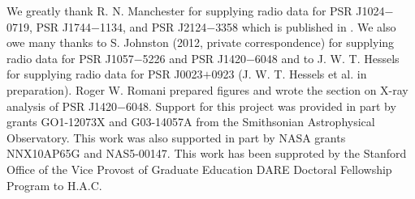 \acknowledgements
We greatly thank R. N. Manchester for supplying 
radio data for PSR J1024$-$0719, PSR J1744$-$1134, and PSR J2124$-$3358 which is
published in \cite{yan2011polarization}.
We also owe many thanks to S. Johnston (2012, private correspondence) 
for supplying radio data for
PSR J1057$-$5226 and PSR J1420$-$6048 and to J. W. T. Hessels for supplying
radio data for PSR J0023$+$0923 (J. W. T. Hessels et al. in preparation).
Roger W. Romani prepared figures and wrote the section on X-ray analysis of PSR J1420$-$6048.
Support for this project was provided in part by grants GO1-12073X and
G03-14057A from the Smithsonian Astrophysical Observatory. This work
was also supported in part by NASA grants NNX10AP65G and NAS5-00147.
This work has been supproted by the Stanford Office of the Vice Provost
of Graduate Education DARE Doctoral Fellowship Program to H.A.C.

